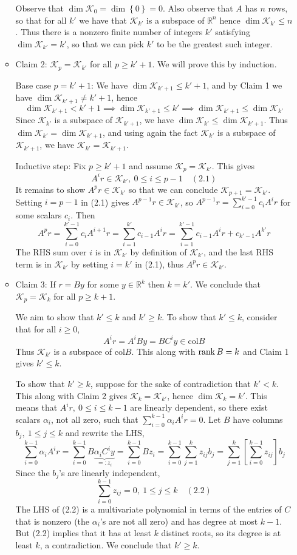\documentclass{article}
\def\mbb#1{\mathbb{#1}}
\def\bR{\mbb{R}}
\newcommand{\sbr}[1]{\left[#1\right]}
\newcommand{\brc}[1]{\left\{#1\right\}}
\newcommand{\imp}{\implies}
\renewcommand{\a}{\alpha}
\newcommand{\K}{\mathcal{K}}
\begin{document}
\begin{enumerate}
\begin{itemize}
		Observe that $\dim\K_0=\dim\brc0=0$. Also observe that $A$ has $n$ rows, so that for all $k'$ we have that $\K_{k'}$ is a subspace of $\bR^n$ hence $\dim\K_{k'}\le n$. Thus there is a nonzero finite number of integers $k'$ satisfying $\dim\K_{k'}=k'$, so that we can pick $k'$ to be the greatest such integer. 
		
		
		\item Claim 2: $\K_p=\K_{k'}$ for all $p\ge k'+1$. We will prove this by induction.
		
		Base case $p=k'+1$: We have $\dim\K_{k'+1}\le k'+1$, and by Claim 1 we have $\dim\K_{k'+1}\ne k'+1$, hence
		\[\dim\K_{k'+1}<k'+1
		\imp \dim\K_{k'+1}\le k'
		\imp \dim\K_{k'+1}\le\dim\K_{k'}\]
		Since $\K_{k'}$ is a subspace of $\K_{k'+1}$, we have $\dim\K_{k'}\le\dim\K_{k'+1}$. Thus $\dim\K_{k'}=\dim\K_{k'+1}$, and using again the fact $\K_{k'}$ is a subspace of $\K_{k'+1}$, we have $\K_{k'}=\K_{k'+1}$.
		
		Inductive step: Fix $p\ge k'+1$ and assume $\K_p=\K_{k'}$. This gives
		\[A^ir\in\K_{k'},~ 0\le i\le p-1 \quad (2.1)\]
		It remains to show $A^pr\in\K_{k'}$ so that we can conclude $\K_{p+1}=\K_{k'}$. Setting $i=p-1$ in (2.1) gives $A^{p-1}r\in\K_{k'}$, so $A^{p-1}r=\sum_{i=0}^{k'-1}c_iA^ir$ for some scalars $c_i$. Then
		\[A^pr = \sum_{i=0}^{k'-1} c_iA^{i+1}r
		= \sum_{i=1}^{k'} c_{i-1}A^ir
		= \sum_{i=1}^{k'-1} c_{i-1}A^ir + c_{k'-1}A^{k'}r\]
		The RHS sum over $i$ is in $\K_{k'}$ by definition of $\K_{k'}$, and the last RHS term is in $\K_{k'}$ by setting $i=k'$ in (2.1), thus $A^pr\in\K_{k'}$.
		
		
		\item Claim 3: If $r=By$ for some $y\in\bR^k$ then $k=k'$. We conclude that $\K_p=\K_k$ for all $p\ge k+1$.
		
		We aim to show that $k'\le k$ and $k'\ge k$. To show that $k'\le k$, consider that for all $i\ge0$,
		\[A^ir = A^iBy = BC^iy \in \mathrm{col}B\]
		Thus $\K_{k'}$ is a subspace of $\mathrm{col}B$. This along with $\rank B=k$ and Claim 1 gives $k'\le k$.
		
		To show that $k'\ge k$, suppose for the sake of contradiction that $k'<k$. This along with Claim 2 gives $\K_k=\K_{k'}$, hence $\dim\K_k=k'$. This means that $A^ir,~0\le i\le k-1$ are linearly dependent, so there exist scalars $\a_i$, not all zero, such that $\sum_{i=0}^{k-1}\a_i A^ir=0$. Let $B$ have columns $b_j,~1\le j\le k$ and rewrite the LHS,
		\[\sum_{i=0}^{k-1} \a_i A^ir = \sum_{i=0}^{k-1}B\underbrace{\a_iC^iy}_{=:z_i}
		= \sum_{i=0}^{k-1} Bz_i
		= \sum_{i=0}^{k-1}\sum_{j=1}^k z_{ij}b_j
		= \sum_{j=1}^k\sbr{\sum_{i=0}^{k-1}z_{ij}}b_j\]
		Since the $b_j$'s are linearly independent,
		\[\sum_{i=0}^{k-1}z_{ij} = 0,~ 1\le j\le k \quad (2.2)\]
		The LHS of (2.2) is a multivariate polynomial in terms of the entries of $C$ that is nonzero (the $\a_i$'s are not all zero) and has degree at most $k-1$. But (2.2) implies that it has at least $k$ distinct roots, so its degree is at least $k$, a contradiction. We conclude that $k'\ge k$.
		

\end{itemize}
\end{enumerate}
\end{document}
